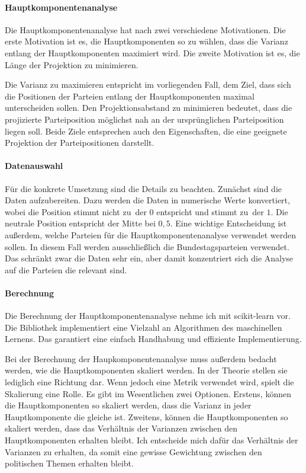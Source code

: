\paragraph{Hauptkomponentenanalyse}
Die Hauptkomponentenanalyse hat nach \citet{bishop2006pattern} zwei verschiedene Motivationen. Die erste Motivation ist es, die Hauptkomponenten so zu wählen, dass die Varianz entlang der Hauptkomponenten maximiert wird.
Die zweite Motivation ist es, die Länge der Projektion zu minimieren. \citep[Kap.\,12.1, S.\,561-570]{bishop2006pattern}

Die Varianz zu maximieren entspricht im vorliegenden Fall, dem Ziel, dass sich die Positionen der Parteien entlang der Hauptkomponenten maximal unterscheiden sollen.
Den Projektionsabstand zu minimieren bedeutet, dass die projizierte Parteiposition möglichst nah an der ursprünglichen Parteiposition liegen soll.
Beide Ziele entsprechen auch den Eigenschaften, die eine geeignete Projektion der Parteipositionen darstellt.

\paragraph{Datenauswahl}
Für die konkrete Umsetzung sind die Details zu beachten.
Zunächst sind die Daten aufzubereiten. Dazu werden die Daten in numerische Werte konvertiert, wobei die Position \glqq stimmt nicht zu\grqq\ der $0$ entspricht und \glqq stimmt zu\grqq\ der $1$.
Die neutrale Position entspricht der Mitte bei $0,5$.
Eine wichtige Entscheidung ist außerdem, welche Parteien für die Hauptkomponentenanalyse verwendet werden sollen.
In diesem Fall werden ausschließlich die Bundestagsparteien verwendet.
Das schränkt zwar die Daten sehr ein, aber damit konzentriert sich die Analyse auf die Parteien die relevant sind.

\paragraph{Berechnung}
Die Berechnung der Hauptkomponentenanalyse nehme ich mit scikit-learn \citep{scikit-learn} vor. Die Bibliothek implementiert eine Vielzahl an Algorithmen des maschinellen Lernens. Das garantiert eine einfach Handhabung und effiziente Implementierung.

Bei der Berechnung der Haupkomponentenanalyse muss außerdem bedacht werden, wie die Hauptkomponenten skaliert werden. In der Theorie stellen sie lediglich eine Richtung dar. Wenn jedoch eine Metrik verwendet wird, spielt die Skalierung eine Rolle. Es gibt im Wesentlichen zwei Optionen. Erstens, können die Hauptkomponenten so skaliert werden, dass die Varianz in jeder Hauptkomponente die gleiche ist. Zweitens, können die Hauptkomponenten so skaliert werden, dass das Verhältnis der Varianzen zwischen den Hauptkomponenten erhalten bleibt. Ich entscheide mich dafür das Verhältnis der Varianzen zu erhalten, da somit eine gewisse Gewichtung zwischen den politischen Themen erhalten bleibt.

